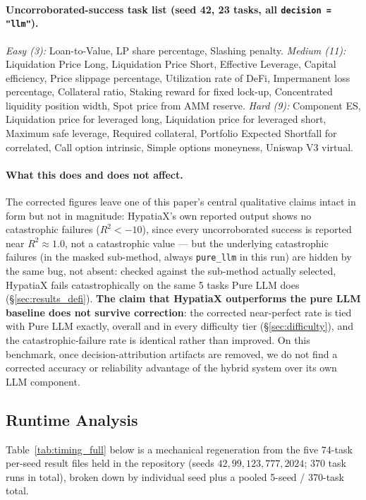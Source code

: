 \documentclass[twoside,11pt]{article}
\newcommand{\Rsq}{R^{2}}
\begin{document}
\paragraph{Uncorroborated-success task list (seed 42, 23 tasks, all
\texttt{decision = "llm"}).} \emph{Easy (3):} Loan-to-Value, LP share
percentage, Slashing penalty.
\emph{Medium (11):} Liquidation Price Long, Liquidation Price Short,
Effective Leverage, Capital efficiency, Price slippage percentage,
Utilization rate of DeFi, Impermanent loss percentage, Collateral ratio,
Staking reward for fixed lock-up, Concentrated liquidity position width,
Spot price from AMM reserve.
\emph{Hard (9):} Component ES, Liquidation price for leveraged long,
Liquidation price for leveraged short, Maximum safe leverage, Required
collateral, Portfolio Expected Shortfall for correlated, Call option
intrinsic, Simple options moneyness, Uniswap V3 virtual.

\paragraph{What this does and does not affect.} The corrected figures leave
one of this paper's central qualitative claims intact in form but not in
magnitude: HypatiaX's own reported output shows no catastrophic failures
($\Rsq < -10$), since every uncorroborated success is reported near
$\Rsq \approx 1.0$, not a catastrophic value --- but the underlying
catastrophic failures (in the masked sub-method, always \texttt{pure\_llm}
in this run) are hidden by the same bug, not absent: checked against the
sub-method actually selected, HypatiaX fails catastrophically on the same
5 tasks Pure LLM does (\S\ref{sec:results_defi}). \textbf{The claim that
HypatiaX outperforms the pure LLM baseline does not survive correction}:
the corrected near-perfect rate is tied with Pure LLM exactly, overall
and in every difficulty tier (\S\ref{sec:difficulty}), and the
catastrophic-failure rate is identical rather than improved. On this
benchmark, once decision-attribution artifacts are removed, we do not
find a corrected accuracy or reliability advantage of the hybrid system
over its own LLM component.

\subsection{Runtime Analysis}\label{subsec:runtime-analysis}
\label{sec:timing}

Table~\ref{tab:timing_full} below is a mechanical regeneration from the five 74-task per-seed result files held in the repository (seeds $42, 99, 123, 777, 2024$; $370$ task runs in total), broken down by individual seed plus a pooled 5-seed / 370-task total.
\end{document}
